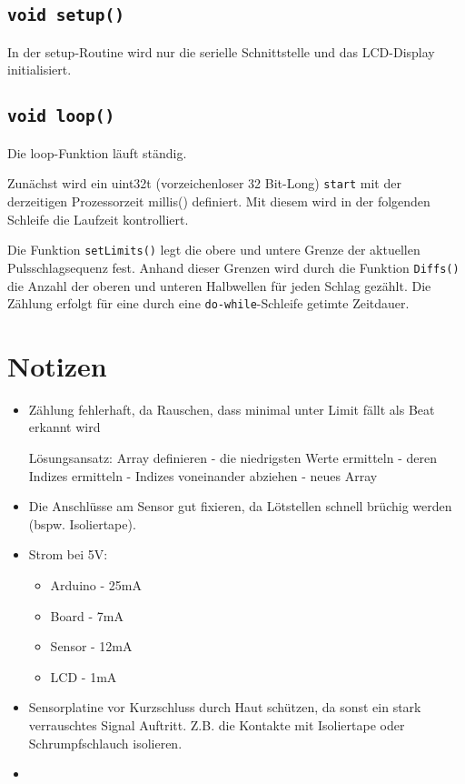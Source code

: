 \documentclass[10pt, a4paper]{article}
\begin{document}
\subsection{\texttt{void setup()}}
In der setup-Routine wird nur die serielle Schnittstelle und das LCD-Display initialisiert.

\subsection{\texttt{void loop()}}
Die loop-Funktion läuft ständig.

Zunächst wird ein uint32\textunderscore t (vorzeichenloser 32 Bit-Long) \texttt{start} mit der derzeitigen Prozessorzeit millis() definiert. Mit diesem wird in der folgenden Schleife die Laufzeit kontrolliert.

Die Funktion \texttt{setLimits()} legt die obere und untere Grenze der aktuellen Pulsschlagsequenz fest.
Anhand dieser Grenzen wird durch die Funktion \texttt{Diffs()} die Anzahl der oberen und unteren Halbwellen für jeden Schlag gezählt. Die Zählung erfolgt für eine durch eine \texttt{do-while}-Schleife getimte Zeitdauer.

\section{Notizen}
\begin{itemize}
    \item Zählung fehlerhaft, da Rauschen, dass minimal unter Limit fällt als Beat erkannt wird
    
    Lösungsansatz: Array definieren - die niedrigsten Werte ermitteln - deren Indizes ermitteln - Indizes voneinander abziehen - neues Array 
    \item Die Anschlüsse am Sensor gut fixieren, da Lötstellen schnell brüchig werden (bspw. Isoliertape).
    \item Strom bei 5V: 
    \begin{itemize}
        \item Arduino - 25mA
        \item Board - 7mA
        \item Sensor - 12mA
        \item LCD - 1mA
    \end{itemize}
    \item Sensorplatine vor Kurzschluss durch Haut schützen, da sonst ein stark verrauschtes Signal Auftritt. Z.B. die Kontakte mit Isoliertape oder Schrumpfschlauch isolieren.
    \item 
\end{itemize}
    
\end{document}
